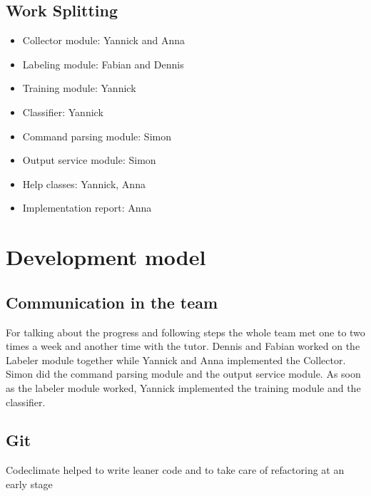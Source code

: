 \documentclass[parskip=full]{scrartcl}
\begin{document}
\subsection{Work Splitting}
\begin{itemize}

\item Collector module: Yannick and Anna

\item Labeling module: Fabian and Dennis

\item Training module: Yannick

\item Classifier: Yannick

\item Command parsing module: Simon

\item Output service module: Simon

\item Help classes: Yannick, Anna

\item Implementation report: Anna

\end{itemize}

\section{Development model}
\subsection{Communication in the team}
For talking about the progress and following steps the whole team met one to two times a week and another time with the tutor.
Dennis and Fabian worked on the Labeler module together while Yannick and Anna implemented the Collector.
Simon did the command parsing module and the output service module.
As soon as the labeler module worked, Yannick implemented the training module and the classifier.
\subsection{Git}
Codeclimate helped to write leaner code and to take care of refactoring at an early stage
\end{document}
